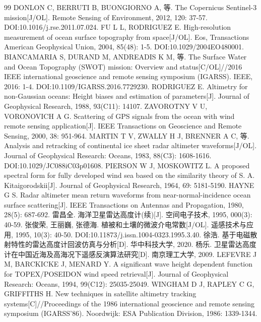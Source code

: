 \documentclass[a4paper]{article}
\begin{document}
\begin{thebibliography}{99}
	 DONLON C, BERRUTI B, BUONGIORNO A, 等. The Copernicus Sentinel-3 mission[J/OL]. Remote Sensing of Environment, 2012, 120: 37-57. DOI:10.1016/j.rse.2011.07.024.
	 FU L L, RODRIGUEZ E. High-resolution measurement of ocean surface topography from space[J/OL]. Eos, Transactions American Geophysical Union, 2004, 85(48): 1-5. DOI:10.1029/2004EO480001.
	 BIANCAMARIA S, DURAND M, ANDREADIS K M, 等. The Surface Water and Ocean Topography (SWOT) mission: Overview and status[C/OL]//2016 IEEE international geoscience and remote sensing symposium (IGARSS). IEEE, 2016: 1-4. DOI:10.1109/IGARSS.2016.7729230.
	 RODRIGUEZ E. Altimetry for non-Gaussian oceans: Height biases and estimation of parameters[J]. Journal of Geophysical Research, 1988, 93(C11): 14107.
	 ZAVOROTNY V U, VORONOVICH A G. Scattering of GPS signals from the ocean with wind remote sensing application[J]. IEEE Transactions on Geoscience and Remote Sensing, 2000, 38: 951-964.
	 MARTIN T V, ZWALLY H J, BRENNER A C, 等. Analysis and retracking of continental ice sheet radar altimeter waveforms[J/OL]. Journal of Geophysical Research: Oceans, 1983, 88(C3): 1608-1616. DOI:10.1029/JC088iC03p01608.
	 PIERSON W J, MOSKOWITZ L. A proposed spectral form for fully developed wind sea based on the similarity theory of S. A. Kitaigorodskii[J]. Journal of Geophysical Research, 1964, 69: 5181-5190.
	 HAYNE G S. Radar altimeter mean return waveforms from near-normal-incidence ocean surface scattering[J]. IEEE Transactions on Antennas and Propagation, 1980, 28(5): 687-692.
	 雷昌全. 海洋卫星雷达高度计(续)[J]. 空间电子技术, 1995, 000(3): 40-59.
	 张俊荣, 王丽巍, 张德海. 植被和土壤的微波介电常数[J/OL]. 遥感技术与应用, 1995, 10(3): 40-50. DOI:10.11873/j.issn.1004-0323.1995.3.40.
	 徐浩. 基于电磁散射特性的雷达高度计回波仿真与分析[D]. 华中科技大学, 2020.
	 杨乐. 卫星雷达高度计在中国近海及高海况下遥感反演算法研究[D]. 南京理工大学, 2009.
	 LEFEVRE J M, BARCKICKE J, MENARD Y. A significant wave height dependent function for TOPEX/POSEIDON wind speed retrieval[J]. Journal of Geophysical Research: Oceans, 1994, 99(C12): 25035-25049.
	 WINGHAM D J, RAPLEY C G, GRIFFITHS H. New techniques in satellite altimetry tracking systems[C]//Proceedings of the 1986 international geoscience and remote sensing symposium (IGARSS'86). Noordwijk: ESA Publication Division, 1986: 1339-1344.

\end{thebibliography}
\end{document}
